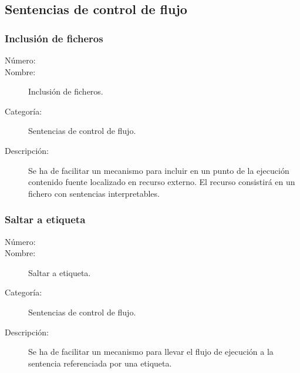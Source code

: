 \subsection{Sentencias de control de flujo}
\subsubsection{Inclusión de ficheros}
\begin{framed}
	\begin{description}
		\item [Número:] \cn
		\item [Nombre:] Inclusión de ficheros.
		\item [Categoría:] Sentencias de control de flujo.
		\item [Descripción:] Se ha de facilitar un mecanismo para incluir en un punto de la ejecución contenido fuente localizado en recurso
		externo. El recurso consistirá en un fichero con sentencias interpretables.
	\end {description}
\end{framed}

\subsubsection{Saltar a etiqueta}
\begin{framed}
	\begin{description}
		\item [Número:] \cn
		\item [Nombre:] Saltar a etiqueta.
		\item [Categoría:] Sentencias de control de flujo.
		\item [Descripción:] Se ha de facilitar un mecanismo para llevar el flujo de ejecución a la sentencia  
		referenciada por una etiqueta.
	\end {description}
\end{framed}

